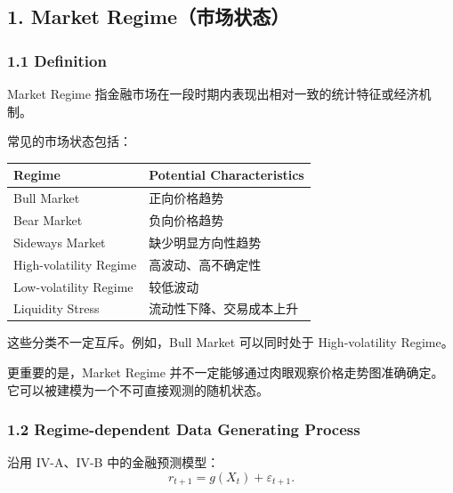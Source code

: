 \hypertarget{part-4-77-0001-market-regimeux5e02ux573aux72b6ux6001}{%
\subsection{1. Market Regime（市场状态）}\label{part-4-77-0001-market-regimeux5e02ux573aux72b6ux6001}}

\hypertarget{part-4-77-0001-definition}{%
\subsubsection{1.1 Definition}\label{part-4-77-0001-definition}}

Market Regime 指金融市场在一段时期内表现出相对一致的统计特征或经济机制。

常见的市场状态包括：

\begin{readertable}
\begin{longtable}[]{@{}
  >{\raggedright\arraybackslash}p{}
  >{\raggedright\arraybackslash}p{}@{}}
\toprule
Regime & Potential Characteristics \\
\midrule
\endhead
Bull Market & 正向价格趋势 \\
Bear Market & 负向价格趋势 \\
Sideways Market & 缺少明显方向性趋势 \\
High-volatility Regime & 高波动、高不确定性 \\
Low-volatility Regime & 较低波动 \\
Liquidity Stress & 流动性下降、交易成本上升 \\
\bottomrule
\end{longtable}
\end{readertable}

这些分类不一定互斥。例如，Bull Market 可以同时处于 High-volatility Regime。

更重要的是，Market Regime 并不一定能够通过肉眼观察价格走势图准确确定。它可以被建模为一个不可直接观测的随机状态。

\hypertarget{part-4-77-0001-regime-dependent-data-generating-process}{%
\subsubsection{1.2 Regime-dependent Data Generating Process}\label{part-4-77-0001-regime-dependent-data-generating-process}}

沿用 IV-A、IV-B 中的金融预测模型：
\[r_{t+1}=g(X_t)+\varepsilon_{t+1}.\]

